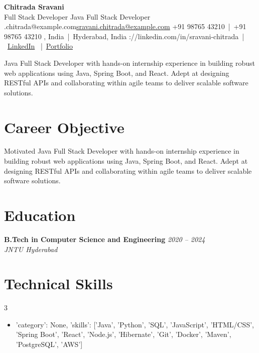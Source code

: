 \documentclass[11pt, letterpaper]{article}
\begin{document}
\begin{center}
    {\huge\bfseries\color{primary} Chitrada Sravani} \\ \vspace{0.3em}
    \ifx\relaxJava Full Stack Developer\relax\else
    {\large\color{secondary} Java Full Stack Developer} \\ \vspace{0.3em}
    \fi
    {\small\color{secondary}
    \ifx\relaxsravani.chitrada@example.com\relax\else\href{mailto:sravani.chitrada@example.com}{sravani.chitrada@example.com}\fi
    \ifx\relax+91 98765 43210\relax\else\ |\ +91 98765 43210\fi
    \ifx\relaxHyderabad, India\relax\else\ |\ Hyderabad, India\fi
    \ifx\relaxhttps://linkedin.com/in/sravani-chitrada\relax\else\ |\ \href{https://linkedin.com/in/sravani-chitrada}{LinkedIn}\fi
    \ifx\relax\relax\else\ |\ \href{}{Portfolio}\fi
    }
\end{center}

\ifx\relaxMotivated Java Full Stack Developer with hands-on internship experience in building robust web applications using Java, Spring Boot, and React. Adept at designing RESTful APIs and collaborating within agile teams to deliver scalable software solutions.\relax\else
\section*{Career Objective}
Motivated Java Full Stack Developer with hands-on internship experience in building robust web applications using Java, Spring Boot, and React. Adept at designing RESTful APIs and collaborating within agile teams to deliver scalable software solutions.
\fi

\section*{Education}
\textbf{B.Tech in Computer Science and Engineering} \hfill \textit{2020 – 2024} \\
\textit{JNTU Hyderabad}
\vspace{0.5em}

\section*{Technical Skills}
\begin{multicols}{3}
\begin{itemize}[label=•, leftmargin=*, noitemsep]
    \item {'category': None, 'skills': ['Java', 'Python', 'SQL', 'JavaScript', 'HTML/CSS', 'Spring Boot', 'React', 'Node.js', 'Hibernate', 'Git', 'Docker', 'Maven', 'PostgreSQL', 'AWS']}
\end{itemize}
\end{multicols}
\vspace{-1.5em} 
\end{document}
